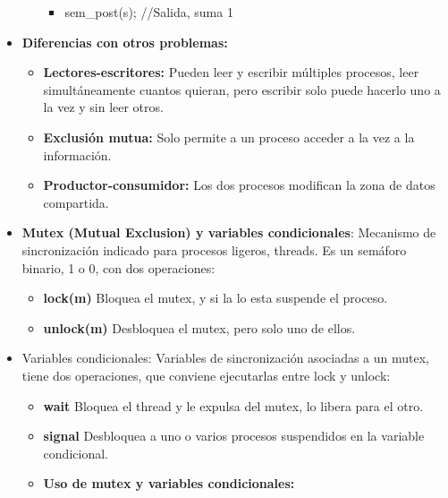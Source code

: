 \documentclass[12pt, twoside, openright]{report} %
\begin{document}
\begin{itemize}
\begin{itemize}
\begin{itemize}
      \item sem\_post(s); //Salida, suma 1
        
      \end{itemize}
    \end{itemize}
  \item \textbf{Diferencias con otros problemas:}
    

    \begin{itemize}
    \item \textbf{Lectores-escritores:} Pueden leer y escribir múltiples
      procesos, leer simultáneamente cuantos quieran, pero escribir solo
      puede hacerlo uno a la vez y sin leer otros.
      
    \item \textbf{Exclusión mutua:} Solo permite a un proceso acceder a la
      vez a la información.
      
    \item \textbf{Productor-consumidor:} Los dos procesos modifican la zona
      de datos compartida.
      
    \end{itemize}
  \item \textbf{Mutex (Mutual Exclusion) y variables condicionales}:
    Mecanismo de sincronización indicado para procesos ligeros, threads.
    Es un semáforo binario, 1 o 0, con dos operaciones:
    

    \begin{itemize}
    \item \textbf{lock(m)} Bloquea el mutex, y si la lo esta suspende el
      proceso.
      
    \item \textbf{unlock(m)} Desbloquea el mutex, pero solo uno de ellos.
      
    \end{itemize}
  \item Variables condicionales: Variables de sincronización asociadas a un
    mutex, tiene dos operaciones, que conviene ejecutarlas entre lock y
    unlock:
    

    \begin{itemize}
    \item \textbf{wait} Bloquea el thread y le expulsa del mutex, lo libera
      para el otro.
      
    \item \textbf{signal} Desbloquea a uno o varios procesos suspendidos en
      la variable condicional.
      
    \item \textbf{Uso de mutex y variables condicionales:}
      
    \end{itemize}
  \end{itemize}
\end{document}

